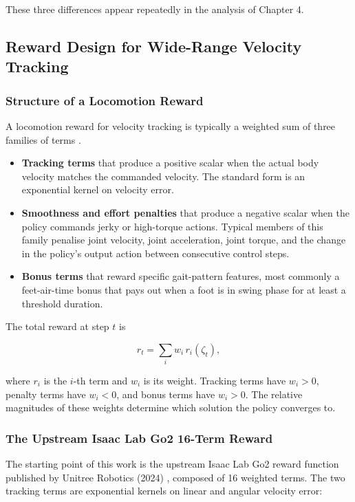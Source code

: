 These three differences appear repeatedly in the analysis of Chapter 4.

\subsection{Reward Design for Wide-Range Velocity Tracking}

\subsubsection{Structure of a Locomotion Reward}

A locomotion reward for velocity tracking is typically a weighted sum of three families of terms \cite{rudin2022}.

\begin{itemize}
  \item \textbf{Tracking terms} that produce a positive scalar when the actual body velocity matches the commanded velocity. The standard form is an exponential kernel on velocity error.
  \item \textbf{Smoothness and effort penalties} that produce a negative scalar when the policy commands jerky or high-torque actions. Typical members of this family penalise joint velocity, joint acceleration, joint torque, and the change in the policy's output action between consecutive control steps.
  \item \textbf{Bonus terms} that reward specific gait-pattern features, most commonly a feet-air-time bonus that pays out when a foot is in swing phase for at least a threshold duration.
\end{itemize}

The total reward at step $t$ is

\[
r_t = \sum_{i} w_i\, r_i(\zeta_t),
\]

where $r_i$ is the $i$-th term and $w_i$ is its weight. Tracking terms have $w_i > 0$, penalty terms have $w_i < 0$, and bonus terms have $w_i > 0$. The relative magnitudes of these weights determine which solution the policy converges to.

\subsubsection{The Upstream Isaac Lab Go2 16-Term Reward}

The starting point of this work is the upstream Isaac Lab Go2 reward function published by Unitree Robotics (2024) \cite{unitree2024}, composed of 16 weighted terms. The two tracking terms are exponential kernels on linear and angular velocity error:


